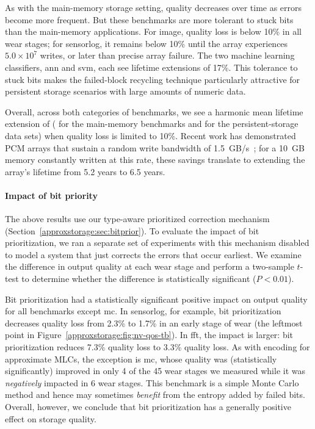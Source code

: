 As with the main-memory storage setting, quality decreases over time as errors
become more frequent. But these benchmarks are more tolerant to stuck bits
than the main-memory applications. For \textsf{image}, quality loss is below
10\% in all wear stages; for \textsf{sensorlog}, it remains below 10\% until
the array experiences
$5.0 \times 10^{7}$ writes, or  later than precise array failure.
The two machine learning classifiers, \textsf{ann} and \textsf{svm},
each see lifetime extensions of 17\%.
This tolerance to
stuck bits makes the failed-block recycling technique particularly attractive
for persistent storage scenarios with large amounts of numeric data.

\vskip 12pt
\noindent
Overall, across both categories of benchmarks, we see a harmonic mean
lifetime extension of 
( for the main-memory benchmarks and
 for
the persistent-storage data sets) when quality loss is limited to 10\%.
Recent work has demonstrated PCM arrays that sustain a random write bandwidth of
1.5~GB/s~\cite{moneta};
for a 10~GB memory constantly written at this rate,
these savings translate to extending the array's lifetime
from 5.2 years to 6.5 years.

\paragraph{Impact of bit priority} The above results use our type-aware
prioritized correction mechanism (Section~\ref{approxstorage:sec:bitprior}). To evaluate the
impact of bit prioritization, we ran a separate set of experiments with this
mechanism disabled to model a system that just corrects the errors that
occur earliest. We examine the difference in output quality at each wear stage and
perform a two-sample $t$-test to determine whether the difference is
statistically significant ($P < 0.01$).

Bit prioritization had a statistically significant positive impact on output
quality for all benchmarks except \textsf{mc}. In \textsf{sensorlog}, for example, bit
prioritization decreases quality loss from 2.3\% to 1.7\% in an early stage of
wear (the leftmost point in Figure~\ref{approxstorage:fig:nv-qos-tb}). In \textsf{fft}, the
impact is larger: bit prioritization reduces 7.3\% quality loss to
3.3\% quality loss. As with encoding for approximate MLCs, the exception is \textsf{mc}, whose quality was
(statistically significantly) improved in
only 4 of the 45 wear stages we measured while it was \emph{negatively}
impacted in 6 wear stages. This benchmark is a simple Monte Carlo method
and hence may sometimes \emph{benefit} from the entropy added by failed bits.
Overall, however, we conclude that bit prioritization has a generally positive
effect on storage quality.

